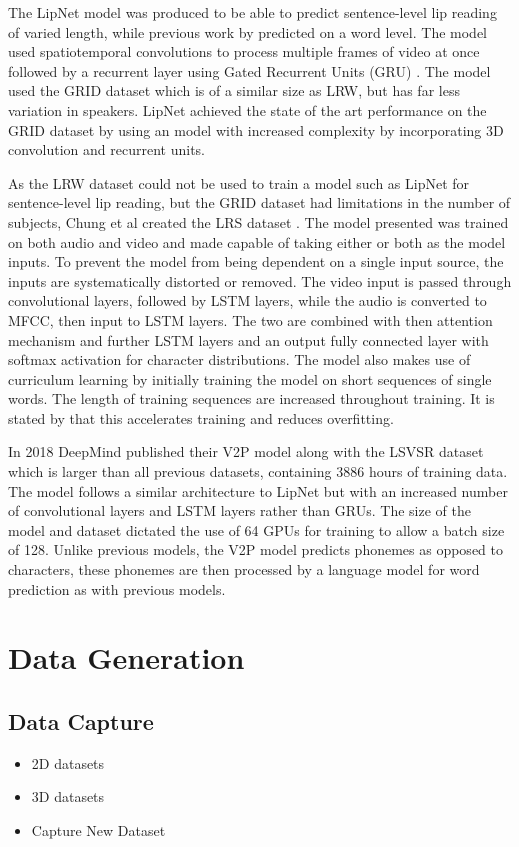 \documentclass[12pt]{article}
\begin{document}
The LipNet model \cite{Assael2016} was produced to be able to predict sentence-level lip reading of varied length, while previous work by \cite{Chung2016} predicted on a word level.
The model used spatiotemporal convolutions to process multiple frames of video at once followed by a recurrent layer using Gated Recurrent Units (GRU) \cite{Cho2014}.
The model used the GRID dataset which is of a similar size as LRW, but has far less variation in speakers.
LipNet achieved the state of the art performance on the GRID dataset by using an model with increased complexity by incorporating 3D convolution and recurrent units.

As the LRW dataset could not be used to train a model such as LipNet for sentence-level lip reading, but the GRID dataset had limitations in the number of subjects, Chung et al created the LRS dataset \cite{Chung2017}.
The model presented was trained on both audio and video and made capable of taking either or both as the model inputs.
To prevent the model from being dependent on a single input source, the inputs are systematically distorted or removed.
The video input is passed through convolutional layers, followed by LSTM layers, while the audio is converted to MFCC, then input to LSTM layers.
The two are combined with then attention mechanism and further LSTM layers and an output fully connected layer with softmax activation for character distributions.
The model also makes use of curriculum learning by initially training the model on short sequences of single words.
The length of training sequences are increased throughout training.
It is stated by \cite{Chung2017} that this accelerates training and reduces overfitting.

In 2018 DeepMind published their V2P model \cite{Shillingford2018} along with the LSVSR dataset which is larger than all previous datasets, containing 3886 hours of training data.
The model follows a similar architecture to LipNet \cite{Assael2016} but with an increased number of convolutional layers and LSTM layers rather than GRUs.
The size of the model and dataset dictated the use of 64 GPUs for training to allow a batch size of 128.
Unlike previous models, the V2P model predicts phonemes as opposed to characters, these phonemes are then processed by a language model for word prediction as with previous models.


\section{Data Generation}
\subsection{Data Capture}
\begin{itemize}
    \item 2D datasets
    \item 3D datasets
    \item Capture New Dataset
\end{itemize}
\end{document}
